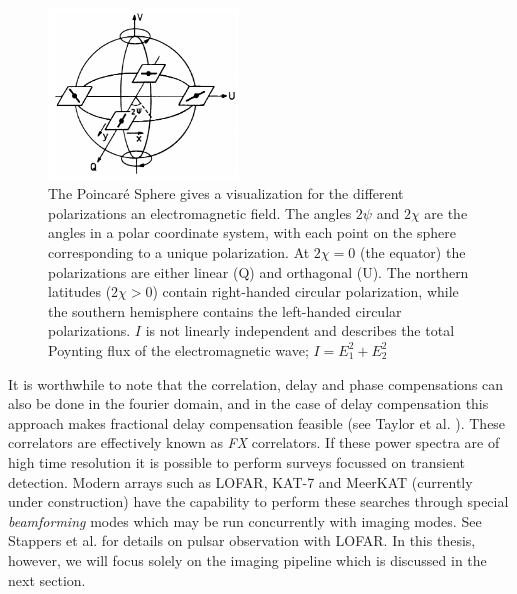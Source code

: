 \documentclass[a4paper,10pt]{report}
\begin{document}
\begin{figure}
 \begin{mdframed}
 \centering
 \includegraphics[width=0.45\textwidth]{images/poincare_sphere.png}
 \caption[The Poincar\'e Sphere]{The Poincar\'e Sphere gives a visualization for the different polarizations an electromagnetic field. The angles $2\psi$ and
 $2\chi$ are the angles in a polar coordinate system, with each point on the sphere corresponding to a unique polarization. At $2\chi=0$ (the equator) the polarizations 
 are either linear (Q) and orthagonal (U). The northern latitudes ($2\chi > 0$) contain right-handed circular polarization, while the southern hemisphere 
 contains the left-handed circular polarizations. $I$ is not linearly independent and describes the total Poynting flux of the electromagnetic wave; $I = E_1^2 + E_2^2$ \cite{wilson2009tools}}
  \label{fig_poincare}
 \end{mdframed}
\end{figure}

It is worthwhile to note that the correlation, delay and phase compensations can also be done in the fourier domain, and in the case of delay compensation this approach makes fractional delay compensation feasible (see Taylor et al. \cite{taylor1999synthesis}). These correlators are effectively 
known as \textit{FX} correlators. If these power spectra are of high time resolution it is possible to perform surveys focussed on transient detection. Modern arrays such as LOFAR, KAT-7 and MeerKAT (currently under construction) have the capability to perform these searches through
special \textit{beamforming} modes which may be run concurrently with imaging modes. See Stappers et al. \cite{stappers2011observing} for details on pulsar observation with LOFAR. In this thesis, however, we will focus solely on the imaging pipeline which is discussed in the next section.
\end{document}
